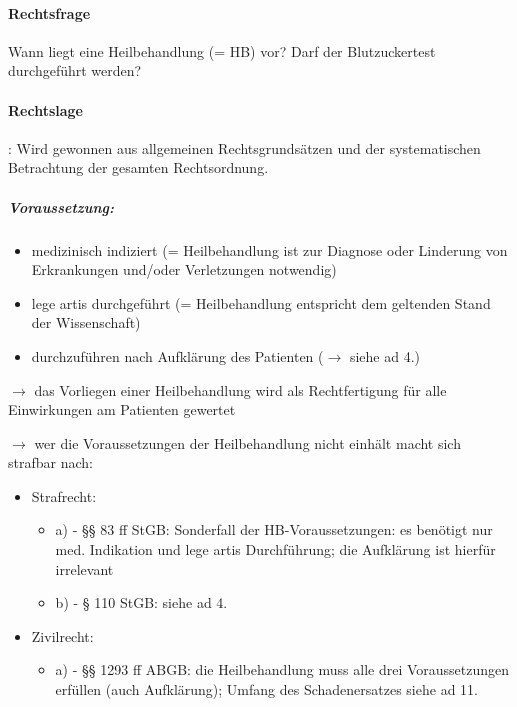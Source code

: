 \paragraph*{Rechtsfrage}
Wann liegt eine  Heilbehandlung  (= HB) vor? Darf der Blutzuckertest
durchgef\"uhrt werden?

\paragraph*{Rechtslage}

:
Wird gewonnen aus allgemeinen Rechtsgrundsätzen und der systematischen
Betrachtung der gesamten Rechtsordnung.

\subparagraph*{Voraussetzung:}

\begin{itemize}
 \item medizinisch indiziert (= Heilbehandlung ist zur Diagnose oder Linderung von Erkrankungen und/oder Verletzungen notwendig)
 \item lege artis durchgef\"uhrt (= Heilbehandlung entspricht dem geltenden Stand der Wissenschaft)
 \item durchzuf\"uhren nach Aufklärung des Patienten
 (${\rightarrow}$ siehe ad 4.)
\end{itemize}

${\rightarrow}$ das Vorliegen einer Heilbehandlung wird als Rechtfertigung f\"ur
alle Einwirkungen am Patienten gewertet

${\rightarrow}$ wer die Voraussetzungen der Heilbehandlung nicht einhält macht
sich strafbar nach:

\begin{itemize}
\item Strafrecht:


 \begin{itemize}
  \item a)  - {\S}{\S} 83 ff StGB: Sonderfall der HB-Voraussetzungen: es ben\"otigt nur med. Indikation und lege artis Durchf\"uhrung; die Aufklärung ist hierf\"ur irrelevant

  \item b)  - {\S} 110 StGB: siehe ad 4.

 \end{itemize}

 \item Zivilrecht:

 \begin{itemize}
  \item a)  - {\S}{\S} 1293 ff ABGB: die Heilbehandlung muss alle drei Voraussetzungen erf\"ullen (auch Aufklärung); Umfang des Schadenersatzes siehe ad 11.
 \end{itemize}

\end{itemize}

